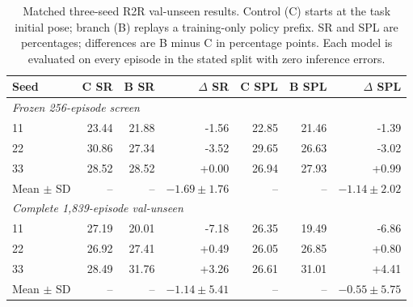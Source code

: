 \begin{table}[t]
\centering
\caption{Matched three-seed R2R val-unseen results. Control (C) starts at the task initial pose; branch (B) replays a training-only policy prefix. SR and SPL are percentages; differences are B minus C in percentage points. Each model is evaluated on every episode in the stated split with zero inference errors.}
\label{tab:branch-scaled}
\begin{tabular}{lrrrrrr}
\toprule
Seed & C SR & B SR & $\Delta$ SR & C SPL & B SPL & $\Delta$ SPL \\
\midrule
\multicolumn{7}{l}{\textit{Frozen 256-episode screen}} \\
\midrule
11 & 23.44 & 21.88 & -1.56 & 22.85 & 21.46 & -1.39 \\
22 & 30.86 & 27.34 & -3.52 & 29.65 & 26.63 & -3.02 \\
33 & 28.52 & 28.52 & +0.00 & 26.94 & 27.93 & +0.99 \\
Mean $\pm$ SD & -- & -- & $-1.69 \pm 1.76$ & -- & -- & $-1.14 \pm 2.02$ \\
\midrule
\multicolumn{7}{l}{\textit{Complete 1,839-episode val-unseen}} \\
\midrule
11 & 27.19 & 20.01 & -7.18 & 26.35 & 19.49 & -6.86 \\
22 & 26.92 & 27.41 & +0.49 & 26.05 & 26.85 & +0.80 \\
33 & 28.49 & 31.76 & +3.26 & 26.61 & 31.01 & +4.41 \\
Mean $\pm$ SD & -- & -- & $-1.14 \pm 5.41$ & -- & -- & $-0.55 \pm 5.75$ \\
\bottomrule
\end{tabular}
\end{table}
